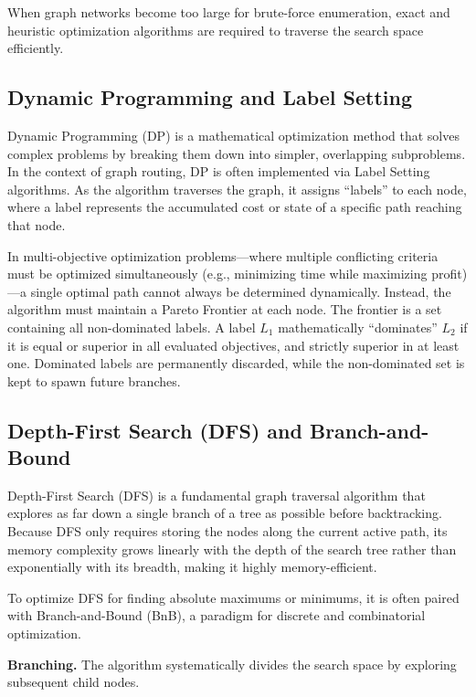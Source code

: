 When graph networks become too large for brute-force enumeration, exact and heuristic optimization algorithms are required to traverse the search space efficiently.

\subsection{Dynamic Programming and Label Setting}
\label{subsec:dp_label_setting}

Dynamic Programming (DP) is a mathematical optimization method that solves complex problems by breaking them down into simpler, overlapping subproblems. In the context of graph routing, DP is often implemented via Label Setting algorithms. As the algorithm traverses the graph, it assigns ``labels'' to each node, where a label represents the accumulated cost or state of a specific path reaching that node.

In multi-objective optimization problems---where multiple conflicting criteria must be optimized simultaneously (e.g., minimizing time while maximizing profit)---a single optimal path cannot always be determined dynamically. Instead, the algorithm must maintain a Pareto Frontier at each node. The frontier is a set containing all non-dominated labels. A label $L_1$ mathematically ``dominates'' $L_2$ if it is equal or superior in all evaluated objectives, and strictly superior in at least one. Dominated labels are permanently discarded, while the non-dominated set is kept to spawn future branches.

\subsection{Depth-First Search (DFS) and Branch-and-Bound}
\label{subsec:dfs_bnb}

Depth-First Search (DFS) is a fundamental graph traversal algorithm that explores as far down a single branch of a tree as possible before backtracking. Because DFS only requires storing the nodes along the current active path, its memory complexity grows linearly with the depth of the search tree rather than exponentially with its breadth, making it highly memory-efficient.

To optimize DFS for finding absolute maximums or minimums, it is often paired with Branch-and-Bound (BnB), a paradigm for discrete and combinatorial optimization.

\medskip

\textbf{Branching.}
The algorithm systematically divides the search space by exploring subsequent child nodes.

